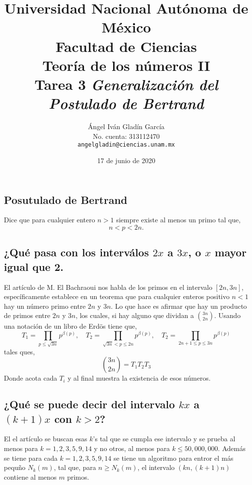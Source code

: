 \documentclass[letterpaper]{article}
\begin{document}
\title{
    \vspace{-2.2em}
        Universidad Nacional Autónoma de México\\
        Facultad de Ciencias\\
        Teoría de los números II\\
    \vspace{.5cm}
    \large
        \textbf{Tarea 3 \emph{Generalización del Postulado de Bertrand}}
}
\author{
    Ángel Iván Gladín García\\
    No. cuenta: 313112470\\
    \texttt{angelgladin@ciencias.unam.mx}
}
\date{17 de junio de 2020}
\maketitle
\subsection*{Posutulado de Bertrand}
Dice que para cualquier entero $n > 1$ siempre existe al menos un primo tal que,
\[
    n < p < 2n.
\]

\subsection*{¿Qué pasa con los interválos $2x$ a $3x$, o $x$ mayor igual que 2.}

El artículo de M. El Bachraoui\cite{Bachraoui} nos habla de los primos en el intervalo $[2n, 3n]$, específicamente
establece en un teorema que para cualquier enteros positivo $n < 1$ hay un número primo entre $2n$ y $3n$.
Lo que hace es afirmar que hay un producto de primos entre $2n$ y $3n$, los cuales, si hay alguno
que dividan a $\binom{3n}{2n}$. Usando una notación de un libro de Erdös tiene que,
\[
    T_1 = \prod_{p \leq \sqrt{3n}} p^{\beta(p)},\quad
    T_2 = \prod_{\sqrt{3n} < p \leq 2n} p^{\beta(p)},\quad
    T_2 = \prod_{2n+1 \leq p \leq 3n} p^{\beta(p)}
\]
tales ques,
\[
    \binom{3n}{2n} = T_1 T_2 T_3
\]
Donde acota cada $T_i$ y al final muestra la existencia de esos números.

\subsection*{¿Qué se puede decir del intervalo $kx$ a $(k+1)x$ con $k>2$?}
El el artículo\cite{shevelev2012intervals} se buscan esas $k$'s tal que se cumpla ese intervalo y se prueba al menos
para $k = 1,2,3,5,9,14$ y no otros, al menos para $k \leq 50,000,000$. Además se tiene para cada $k = 1,2,3,5,9,14$
se tiene un algoritmo para entror el más pequño $N_k(m)$, tal que, para $n \geq N_k(m)$, el intervalo $(kn, (k+1)n)$
contiene al menos $m$ primos.
\end{document}
